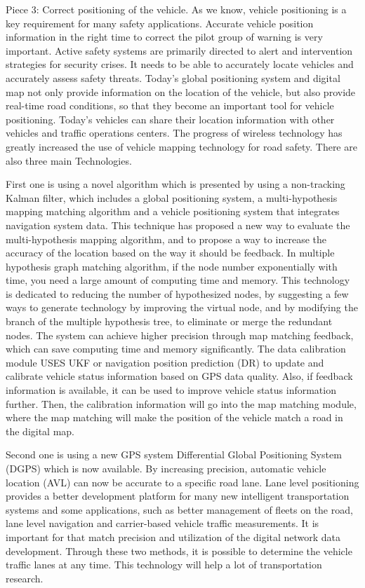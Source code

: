 \documentclass[letterpaper,10pt,draftclsnofoot,onecolumn]{IEEEtran}
\begin{document}
        

Piece 3: Correct positioning of the vehicle. As we know, vehicle positioning is a key requirement for many safety applications. Accurate vehicle position information in the right time to correct the pilot group of warning is very important. Active safety systems are primarily directed to alert and intervention strategies for security crises. It needs to be able to accurately locate vehicles and accurately assess safety threats. Today's global positioning system and digital map not only provide information on the location of the vehicle, but also provide real-time road conditions, so that they become an important tool for vehicle positioning. Today's vehicles can share their location information with other vehicles and traffic operations centers. The progress of wireless technology has greatly increased the use of vehicle mapping technology for road safety. There are also three main Technologies.
    
First one is using a novel algorithm which is presented by using a non-tracking Kalman filter, which includes a global positioning system, a multi-hypothesis mapping matching algorithm and a vehicle positioning system that integrates navigation system data. This technique has proposed a new way to evaluate the multi-hypothesis mapping algorithm, and to propose a way to increase the accuracy of the location based on the way it should be feedback. In multiple hypothesis graph matching algorithm, if the node number exponentially with time, you need a large amount of computing time and memory. This technology is dedicated to reducing the number of hypothesized nodes, by suggesting a few ways to generate technology by improving the virtual node, and by modifying the branch of the multiple hypothesis tree, to eliminate or merge the redundant nodes. The system can achieve higher precision through map matching feedback, which can save computing time and memory significantly. The data calibration module USES UKF or navigation position prediction (DR) to update and calibrate vehicle status information based on GPS data quality. Also, if feedback information is available, it can be used to improve vehicle status information further. Then, the calibration information will go into the map matching module, where the map matching will make the position of the vehicle match a road in the digital map.
                
Second one is using a new GPS system Differential Global Positioning System (DGPS) which is now available. By increasing precision, automatic vehicle location (AVL) can now be accurate to a specific road lane. Lane level positioning provides a better development platform for many new intelligent transportation systems and some applications, such as better management of fleets on the road, lane level navigation and carrier-based vehicle traffic measurements. It is important for that match precision and utilization of the digital network data development. Through these two methods, it is possible to determine the vehicle traffic lanes at any time. This technology will help a lot of transportation research.
                
\end{document}
